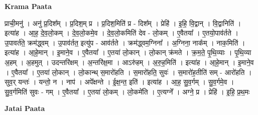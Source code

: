 \documentclass[17pt]{extarticle}
\begin{document}
\textbf{Krama Paata} \newline

प्राची॒मनु॑ । अनु॑ प्र॒दिश᳚म् । प्र॒दिश॒म् प्र । प्र॒दिश॒मिति॑ प्र - दिश᳚म् । प्रेहि॑ । इ॒हि॒ वि॒द्वान् । वि॒द्वानिति॑ । इत्या॑ह । आ॒ह॒ दे॒व॒लो॒कम् । दे॒व॒लो॒कमे॒व । दे॒व॒लो॒कमिति॑ देव - लो॒कम् । ए॒वैतया᳚ । ए॒तयो॒पाव॑र्तते । उ॒पावर्त॑ते॒ क्रम॑द्ध्वम् । उ॒पाव॑र्तत॒ इत्यु॑प - आव॑र्तते । क्रम॑द्ध्वम॒ग्निना᳚ । अ॒ग्निना॒ नाक᳚म् । नाक॒मिति॑ । इत्या॑ह । आ॒हे॒मान् । इ॒माने॒व । ए॒वैतया᳚ । ए॒तया॑ लो॒कान् । लो॒कान् क्र॑मते । क्र॒म॒ते॒ पृ॒थि॒व्याः । पृ॒थि॒व्या अ॒हम् । अ॒हमुत् । उदन्तरि॑क्षम् । अ॒न्तरि॑क्ष॒मा । आऽरु॑हम् । अ॒रु॒ह॒मिति॑ । इत्या॑ह । आ॒हे॒मान् । इ॒माने॒व । ए॒वैतया᳚ । ए॒तया॑ लो॒कान् । लो॒कान्थ् स॒मारो॑हति । स॒मारो॑हति॒ सुवः॑ । स॒मारो॑ह॒तीति॑ सम् - आरो॑हति । सुव॒र् यन्तः॑ । यन्तो॒ न । नाप॑ । अपे᳚क्षन्ते । ई॒क्ष॒न्त॒ इति॑ । इत्या॑ह । आ॒ह॒ सु॒व॒र्गम् । सु॒व॒र्गमे॒व । सु॒व॒र्गमिति॑ सुवः - गम् । ए॒वैतया᳚ । ए॒तया॑ लो॒कम् । लो॒कमे॑ति । ए॒त्यग्ने᳚ । अग्ने॒ प्र । प्रेहि॑ । इ॒हि॒ प्र॒थ॒मः \newline

\textbf{Jatai Paata} \newline
\end{document}
